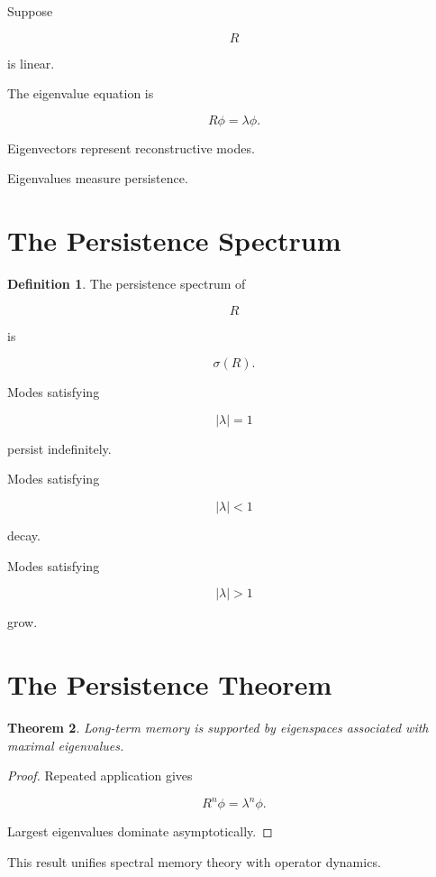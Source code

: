 \documentclass[12pt,oneside]{book}
\theoremstyle{plain} \newtheorem{theorem}{Theorem}[chapter] \newtheorem{lemma}[theorem]{Lemma} \newtheorem{proposition}[theorem]{Proposition} \newtheorem{corollary}[theorem]{Corollary}
\theoremstyle{definition} \newtheorem{definition}[theorem]{Definition} \newtheorem{axiom}[theorem]{Axiom} \newtheorem{construction}[theorem]{Construction}
\theoremstyle{remark} \newtheorem{remark}[theorem]{Remark} \newtheorem{example}[theorem]{Example}
\begin{document}
Suppose

\[
R
\]

is linear.

The eigenvalue equation is

\[
R\phi
=
\lambda\phi.
\]

Eigenvectors represent reconstructive modes.

Eigenvalues measure persistence.

\section{The Persistence Spectrum}

\begin{definition}

The persistence spectrum of

\[
R
\]

is

\[
\sigma(R).
\]

\end{definition}

Modes satisfying

\[
|\lambda|=1
\]

persist indefinitely.

Modes satisfying

\[
|\lambda|<1
\]

decay.

Modes satisfying

\[
|\lambda|>1
\]

grow.

\section{The Persistence Theorem}

\begin{theorem}

Long-term memory is supported by eigenspaces associated with maximal eigenvalues.

\end{theorem}

\begin{proof}

Repeated application gives

\[
R^n\phi
=
\lambda^n\phi.
\]

Largest eigenvalues dominate asymptotically.

\end{proof}

This result unifies spectral memory theory with operator dynamics.
\end{document}
